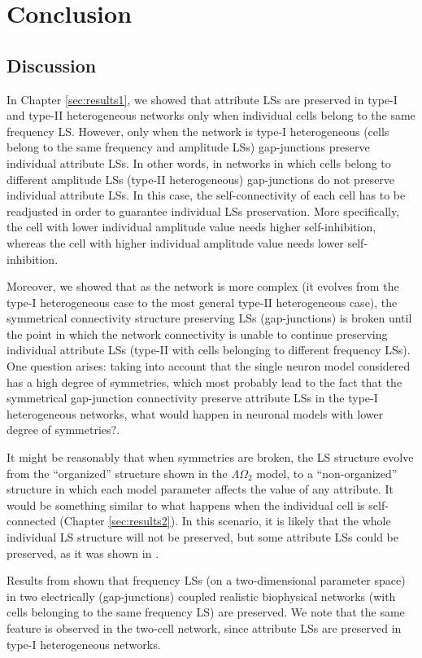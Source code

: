 \chapter{Conclusion}
\label{sec:con}
\section{Discussion}
In Chapter \ref{sec:results1}, we showed that attribute LSs are preserved in type-I and type-II heterogeneous networks only when individual cells belong to the same frequency LS. However, only when the network is type-I heterogeneous (cells belong to the same frequency and amplitude LSs) gap-junctions preserve individual attribute LSs. In other words, in networks in which cells belong to different amplitude LSs (type-II heterogeneous) gap-junctions do not preserve individual attribute LSs. In this case, the self-connectivity of each cell has to be readjusted in order to guarantee individual LSs preservation. More specifically, the cell with lower individual amplitude value needs higher self-inhibition, whereas the cell with higher individual amplitude value needs lower self-inhibition.

Moreover, we showed that as the network is more complex (it evolves from the type-I heterogeneous case to the most general type-II heterogeneous case), the symmetrical connectivity structure preserving LSs (gap-junctions) is broken until the point in which the network connectivity is unable to continue preserving individual attribute LSs (type-II with cells belonging to different frequency LSs). One question arises: taking into account that the single neuron model considered has a high degree of symmetries, which most probably lead to the fact that the symmetrical gap-junction connectivity preserve attribute LSs in the type-I heterogeneous networks, what would happen in neuronal models with lower degree of symmetries?. 

It might be reasonably that when symmetries are broken, the LS structure evolve from the “organized” structure shown in the $\Lambda \Omega_{2}$ model, to a “non-organized” structure in which each model parameter affects the value of any attribute. It would be something similar to what happens when the individual cell is self-connected (Chapter \ref{sec:results2}). In this scenario, it is likely that the whole individual LS structure will not be preserved, but some attribute LSs could be preserved, as it was shown in \cite{Iii2019}.

Results from \cite{Iii2019} shown that frequency LSs (on a two-dimensional parameter space) in two electrically (gap-junctions) coupled realistic biophysical networks (with cells belonging to the same frequency LS) are preserved. We note that the same feature is observed in the two-cell network, since attribute LSs are preserved in type-I heterogeneous networks.

